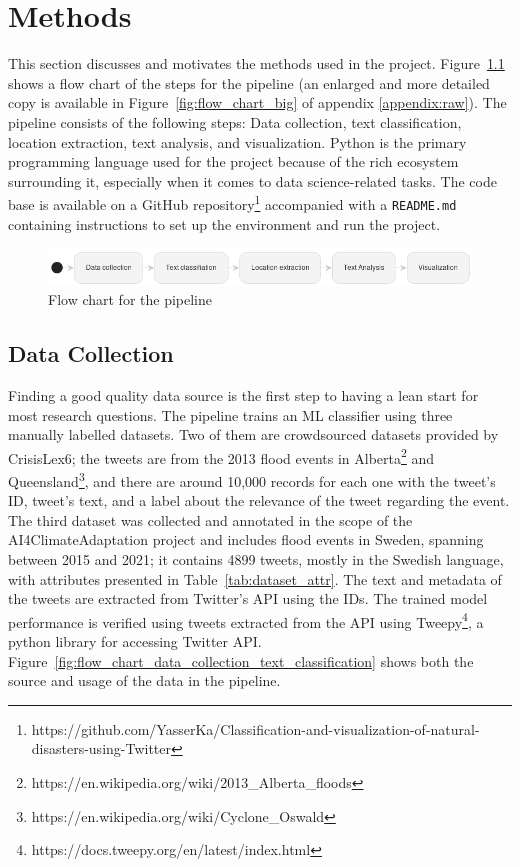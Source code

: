 \chapter{Methods}

This section discusses and motivates the methods used in the project. Figure~\ref{fig:flow_chart}
shows a flow chart of the steps for the pipeline (an enlarged and more detailed copy is available in
Figure~\ref{fig:flow_chart_big} of appendix \ref{appendix:raw}). The pipeline consists of the
following steps: Data collection, text classification, location extraction, text analysis, and visualization.
Python is the primary programming language used for the project because of the rich ecosystem
surrounding it, especially when it comes to data science-related tasks. The code base is available
on a GitHub
repository\footnote{https://github.com/YasserKa/Classification-and-visualization-of-natural-disasters-using-Twitter}
accompanied with a \texttt{README.md} containing instructions to set up the environment and run the
project.

\begin{figure}[H]
\begin{center}
  \includegraphics[width=\columnwidth]{./images/pipeline_concise.png}
\end{center}
\caption{Flow chart for the pipeline}
\label{fig:flow_chart}
\end{figure}

\section{Data Collection}

Finding a good quality data source is the first step to having a lean start for most research
questions. The pipeline trains an \ac{ML} classifier using three manually labelled datasets. Two of
them are crowdsourced datasets provided by CrisisLex6; the tweets are from the 2013 flood events in
Alberta\footnote{https://en.wikipedia.org/wiki/2013\_Alberta\_floods} and
Queensland\footnote{https://en.wikipedia.org/wiki/Cyclone\_Oswald}, and there are around 10,000
records for each one with the tweet's ID, tweet's text, and a label about the relevance of the tweet
regarding the event. The third dataset was collected and annotated in the scope of the
AI4ClimateAdaptation project and includes flood events in Sweden, spanning between 2015 and 2021; it
contains 4899 tweets, mostly in the Swedish language, with attributes presented in
Table~\ref{tab:dataset_attr}. The text and metadata of the tweets are extracted from Twitter's API
using the IDs. The trained model performance is verified using tweets extracted from the API using
Tweepy\footnote{https://docs.tweepy.org/en/latest/index.html}, a python library for accessing
Twitter API. Figure~\ref{fig:flow_chart_data_collection_text_classification} shows both the source
and usage of the data in the pipeline.

